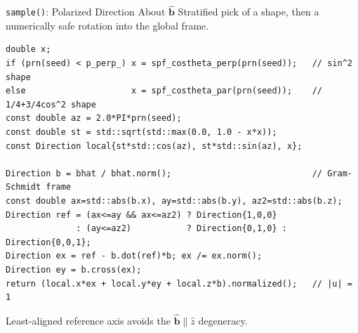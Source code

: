 \documentclass[11pt,aspectratio=169]{beamer}
\newcommand{\bhat}{\hat{\mathbf{b}}}
\begin{document}
\begin{frame}[fragile]{\texttt{sample()}: Polarized Direction About $\bhat$}
Stratified pick of a shape, then a numerically safe rotation into the global frame.
\begin{verbatim}
double x;
if (prn(seed) < p_perp_) x = spf_costheta_perp(prn(seed));   // sin^2 shape
else                     x = spf_costheta_par(prn(seed));    // 1/4+3/4cos^2 shape
const double az = 2.0*PI*prn(seed);
const double st = std::sqrt(std::max(0.0, 1.0 - x*x));
const Direction local{st*std::cos(az), st*std::sin(az), x};

Direction b = bhat / bhat.norm();                            // Gram-Schmidt frame
const double ax=std::abs(b.x), ay=std::abs(b.y), az2=std::abs(b.z);
Direction ref = (ax<=ay && ax<=az2) ? Direction{1,0,0}
              : (ay<=az2)           ? Direction{0,1,0} : Direction{0,0,1};
Direction ex = ref - b.dot(ref)*b; ex /= ex.norm();
Direction ey = b.cross(ex);
return (local.x*ex + local.y*ey + local.z*b).normalized();   // |u| = 1
\end{verbatim}
\footnotesize Least-aligned reference axis avoids the $\bhat\parallel\hat z$ degeneracy.
\end{frame}
\end{document}

